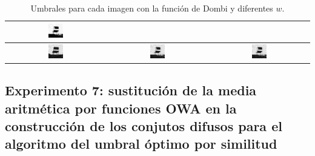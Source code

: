 \begin{table}
\begin{tabular}{c|c|c}
\includegraphics[width=0.15\textwidth]{img/res/e6/alg1agregadoowa3chairsp005.jpg} \\\hline
\includegraphics[width=0.15\textwidth]{img/res/e6/alg1agregadoowa1chairsp020.jpg} &
\includegraphics[width=0.15\textwidth]{img/res/e6/alg1agregadoowa2chairsp020.jpg} &
\includegraphics[width=0.15\textwidth]{img/res/e6/alg1agregadoowa3chairsp020.jpg} \\\hline
\end{tabular}
\caption{Umbrales para cada imagen con la función de Dombi y diferentes $w$.\label{tab:resultexp6imagenesruido}}
\end{table}


\subsection{Experimento 7: sustitución de la media aritmética por funciones OWA en la construcción de los conjutos difusos para el algoritmo del umbral óptimo por similitud}

